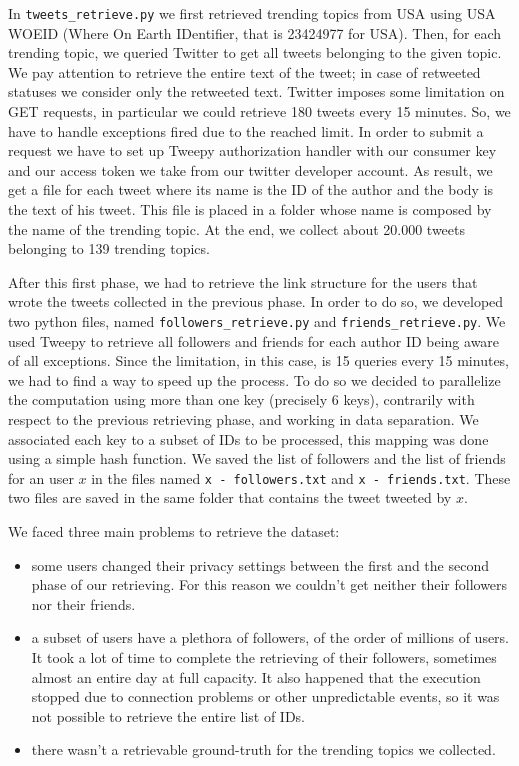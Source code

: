 \documentclass[journal,11pt]{vgtc}
\begin{document}
In \texttt{tweets\_retrieve.py} we
first retrieved trending topics from USA using USA WOEID (Where On Earth IDentifier, that is 23424977 for USA). 
Then, for each trending topic, we queried Twitter to get all tweets belonging to the given topic.
We pay attention to retrieve the entire text of the tweet; in case of retweeted statuses we consider only the 
retweeted text. 
Twitter imposes some limitation on GET requests, in particular we could retrieve 180 tweets every 15 minutes.
So, we have to handle exceptions fired due to the reached limit.
In order to submit a request we have to set up Tweepy authorization handler with our
consumer key and our access token we take from our twitter developer account.
As result, we get a file for each tweet where its name is the ID of the author and the body is the text of his tweet.
This file is placed in a folder whose name is composed by the name of the trending topic.
At the end, we collect about 20.000 tweets belonging to 139 trending topics.

After this first phase, we had to retrieve the link structure for the users that wrote the tweets collected 
in the previous phase. In order to do so, we developed two python files, named \texttt{followers\_retrieve.py} and 
\texttt{friends\_retrieve.py}. 
We used Tweepy to retrieve all followers and friends for each author ID being aware of all exceptions.
Since the limitation, in this case, is 15 queries every 15 minutes, we had to find a way to speed up the process.
To do so we decided to parallelize the computation using more than one key (precisely 6 keys), contrarily with respect to the previous 
retrieving phase, and working in data separation. We associated each key to a subset of IDs to be processed, this
mapping was done using a simple hash function. 
We saved the list of followers and the list of friends for an user $x$ in the files named \texttt{x - followers.txt}
and \texttt{x - friends.txt}. These two files are saved in the same folder that contains the tweet tweeted by $x$.

We faced three main problems to retrieve the dataset:
\begin{itemize}
  \item some users changed their privacy settings between the first and the second phase
  of our retrieving. For this reason we couldn't get neither their followers nor their friends.
  \item a subset of users have a plethora of followers, of the order of millions of users. 
  It took a lot of time to complete the retrieving of their followers, sometimes almost an 
  entire day at full capacity.
  It also happened that the execution stopped due to connection problems or other unpredictable events, 
  so it was not possible to retrieve the entire list of IDs.
  \item there wasn't a retrievable ground-truth for the trending topics we collected.
\end{itemize}
\end{document}
